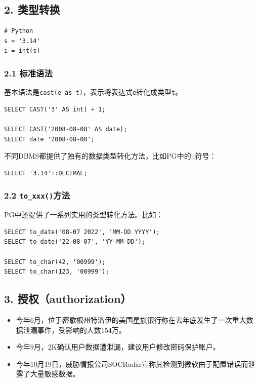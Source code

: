 \documentclass[aspectratio=169, 14pt]{beamer}
\begin{document}
\begin{frame}[fragile]
    \section{\textcolor{darkmidnightblue}{2. 类型转换}}
    \begin{verbatim}
# Python
s = '3.14'
i = int(s)
    \end{verbatim}
\end{frame}

\begin{frame}[fragile]
    \frametitle{2.1 标准语法}
基本语法是\alert{\texttt{cast(e as t)}}，表示将表达式\texttt{e}转化成类型\texttt{t}。   

\begin{verbatim}
SELECT CAST('3' AS int) + 1;

SELECT CAST('2008-08-08' AS date);
SELECT date '2008-08-08';
\end{verbatim}
\pause
不同DBMS都提供了独有的数据类型转化方法，比如PG中的\alert{::}符号：
\begin{verbatim}
SELECT '3.14'::DECIMAL;
\end{verbatim}

\end{frame}

\begin{frame}[fragile]
    \frametitle{2.2 \texttt{to\_xxx()}方法}
PG中还提供了一系列实用的类型转化方法。比如：

\begin{verbatim}
SELECT to_date('08-07 2022', 'MM-DD YYYY');
SELECT to_date('22-08-07', 'YY-MM-DD');

SELECT to_char(42, '00999');
SELECT to_char(123, '00999');
\end{verbatim}

\end{frame}

\begin{frame}[fragile]
    \section{\textcolor{darkmidnightblue}{3. 授权（authorization）}}

    \begin{itemize}
        \item 今年6月，位于密歇根州特洛伊的美国星旗银行称在去年底发生了一次重大数据泄漏事件，受影响的人数154万。
        \item 今年9月，2K确认用户数据遭泄漏，建议用户修改密码保护账户。
        \item 今年10月19日，威胁情报公司SOCRadar宣称其检测到微软由于配置错误而泄露了大量敏感数据。
    \end{itemize}
\end{frame}
\end{document}
